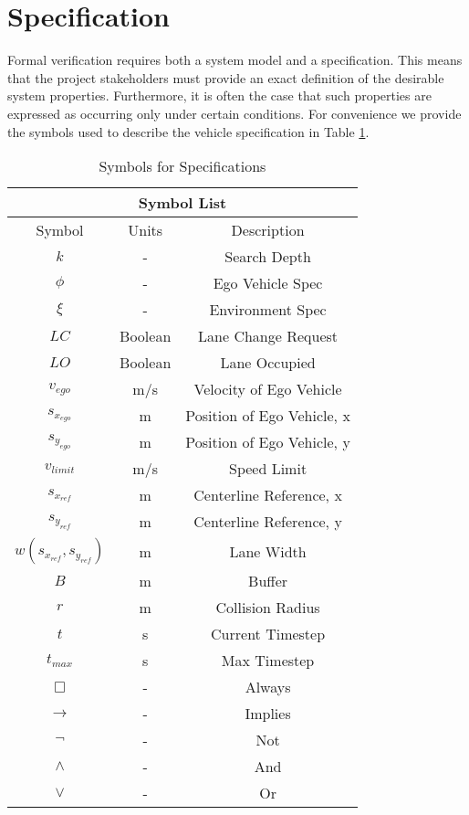 \section{Specification}
Formal verification requires both a system model and a specification. This means that the project stakeholders must provide an exact definition of the desirable system properties. Furthermore, it is often the case that such properties are expressed as occurring only under certain conditions. For convenience we provide the symbols used to describe the vehicle specification in Table \ref{table:vehiclespec}.
\begin{table}[h]
	\centering
	\caption{Symbols for Specifications}
	\label{table:vehiclespec}
	\begin{tabular}{|c|c|c|}
		\hline
		\multicolumn{3}{|c|}{Symbol List} \\ \hline
		Symbol & Units & Description \\ \hline
		$k$ & - & Search Depth \\ \hline
		$\phi$ & - & Ego Vehicle Spec \\ \hline
		$\xi$ & - & Environment Spec \\ \hline
		$LC$ & Boolean & Lane Change Request \\ \hline
		$LO$ & Boolean & Lane Occupied \\ \hline
		$v_{ego}$ & m/s & Velocity of Ego Vehicle \\ \hline
		$s_{x_{ego}}$ & m & Position of Ego Vehicle, x \\ \hline
		$s_{y_{ego}}$ & m & Position of Ego Vehicle, y \\ \hline
		$v_{limit}$ & m/s & Speed Limit \\ \hline
		$s_{x_{ref}}$ & m & Centerline Reference, x \\ \hline
		$s_{y_{ref}}$ & m & Centerline Reference, y \\ \hline
		$w(s_{x_{ref}},s_{y_{ref}})$ & m & Lane Width \\ \hline
		$B$ & m & Buffer\\ \hline
		$r$ & m & Collision Radius \\ \hline
		$t$ & s & Current Timestep \\ \hline
		$t_{max}$ & s & Max Timestep \\ \hline
		$\Box$ & - & Always \\ \hline
		$\to$ & - & Implies \\ \hline
		$\neg$ & - & Not \\ \hline
		$ \wedge$ & - & And \\ \hline
		$ \vee$ & - & Or \\ \hline
	\end{tabular}	
\end{table}
\label{sec:exp specification}

